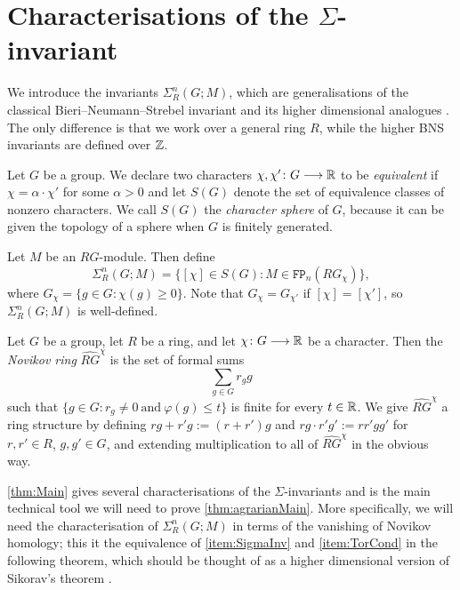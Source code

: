 \documentclass[11pt, letterpaper]{amsart}
\begin{document}
\section{Characterisations of the \texorpdfstring{$\Sigma$}{Sigma}-invariant} \label{sec:SigInv}

We introduce the invariants $\Sigma^n_R(G;M)$, which are generalisations of the classical Bieri--Neumann--Strebel invariant \cite{BNSinv87} and its higher dimensional analogues \cite{BieriRenzValutations}. The only difference is that we work over a general ring $R$, while the higher BNS invariants are defined over $\mathbb{Z}$.

Let $G$ be a group. We declare two characters $\chi,\chi' \colon G \longrightarrow \mathbb{R}$ to be \textit{equivalent} if $\chi = \alpha \cdot \chi'$ for some $\alpha > 0$ and let $S(G)$ denote the set of equivalence classes of nonzero characters. We call $S(G)$ the \textit{character sphere} of $G$, because it can be given the topology of a sphere when $G$ is finitely generated. 

\begin{defn}
Let $M$ be an $RG$-module. Then define
\[
\Sigma^n_R(G;M) = \{ [\chi] \in S(G) : M \in \mathtt{FP}_n(RG_\chi)  \},
\]
where $G_\chi = \{ g \in G : \chi(g) \geqslant 0 \}$. Note that $G_\chi = G_{\chi'}$ if $[\chi] = [\chi']$, so $\Sigma^n_R(G;M)$ is well-defined.
\end{defn}



\begin{defn}
Let $G$ be a group, let $R$ be a ring, and let $\chi \colon G \longrightarrow \mathbb{R}$ be a character. Then the \textit{Novikov ring} $\widehat{RG}^\chi$ is the set of formal sums
\[
\sum_{g \in G} r_g g
\]
such that $\{ g \in G : r_g \neq 0 \ \text{and} \ \varphi(g) \leqslant t \}$ is finite for every $t \in \mathbb{R}$. We give $\widehat{RG}^\chi$ a ring structure by defining $rg + r'g := (r + r')g$ and $rg \cdot r'g' := rr' gg'$ for $r,r' \in R$, $g,g' \in G$, and extending multiplication to all of $\widehat{RG}^\chi$ in the obvious way.
\end{defn}

\cref{thm:Main} gives several characterisations of the $\Sigma$-invariants and is the main technical tool we will need to prove \cref{thm:agrarianMain}. More specifically, we will need the characterisation of $\Sigma_R^n(G;M)$ in terms of the vanishing of Novikov homology; this it the equivalence of \ref{item:SigmaInv} and \ref{item:TorCond} in the following theorem, which should be thought of as a higher dimensional version of Sikorav's theorem \cite{SikoravThese}.
\end{document}

